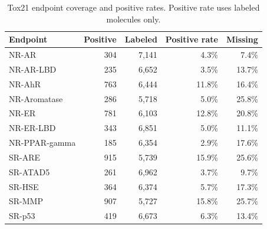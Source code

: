 \begin{table}[t]
\centering
\caption{Tox21 endpoint coverage and positive rates. Positive rate uses labeled molecules only.}
\label{tab:tox21-coverage}
\scriptsize
\begin{tabular}{lrrrr}
\hline
Endpoint & Positive & Labeled & Positive rate & Missing \\
\hline
NR-AR & 304 & 7,141 & 4.3\% & 7.4\% \\
NR-AR-LBD & 235 & 6,652 & 3.5\% & 13.7\% \\
NR-AhR & 763 & 6,444 & 11.8\% & 16.4\% \\
NR-Aromatase & 286 & 5,718 & 5.0\% & 25.8\% \\
NR-ER & 781 & 6,103 & 12.8\% & 20.8\% \\
NR-ER-LBD & 343 & 6,851 & 5.0\% & 11.1\% \\
NR-PPAR-gamma & 185 & 6,354 & 2.9\% & 17.6\% \\
SR-ARE & 915 & 5,739 & 15.9\% & 25.6\% \\
SR-ATAD5 & 261 & 6,962 & 3.7\% & 9.7\% \\
SR-HSE & 364 & 6,374 & 5.7\% & 17.3\% \\
SR-MMP & 907 & 5,727 & 15.8\% & 25.7\% \\
SR-p53 & 419 & 6,673 & 6.3\% & 13.4\% \\
\hline
\end{tabular}
\end{table}
